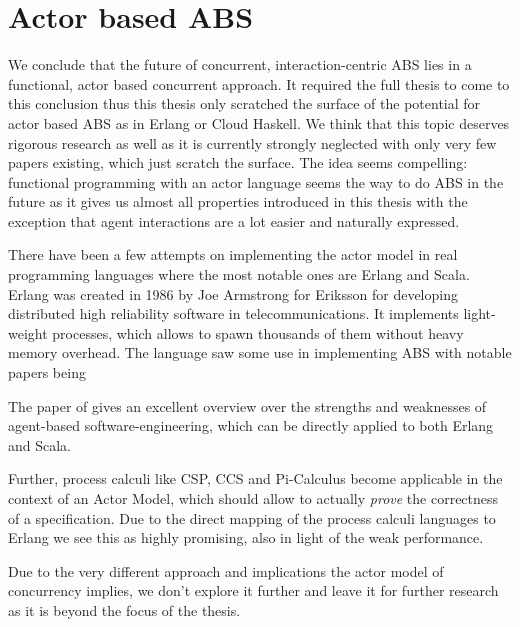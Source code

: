 \section{Actor based ABS}
We conclude that the future of concurrent, interaction-centric ABS lies in a functional, actor based concurrent approach. It required the full thesis to come to this conclusion thus this thesis only scratched the surface of the potential for actor based ABS as in Erlang or Cloud Haskell. We think that this topic deserves rigorous research as well as it is currently strongly neglected with only very few papers existing, which just scratch the surface. The idea seems compelling: functional programming with an actor language seems the way to do ABS in the future as it gives us almost all properties introduced in this thesis with the exception that agent interactions are a lot easier and naturally expressed.

There have been a few attempts on implementing the actor model in real programming languages where the most notable ones are Erlang and Scala. Erlang was created in 1986 by Joe Armstrong for Eriksson for developing distributed high reliability software in telecommunications. It implements light-weight processes, which allows to spawn thousands of them without heavy memory overhead. The language saw some use in implementing ABS with notable papers being \cite{bezirgiannis_improving_2013,di_stefano_using_2005, di_stefano_exat:_2007, varela_modelling_2004, sher_agent-based_2013}


The paper of \cite{jennings_agent-based_2000} gives an excellent overview over the strengths and weaknesses of agent-based software-engineering, which can be directly applied to both Erlang and Scala.

Further, process calculi like CSP, CCS and Pi-Calculus become applicable in the context of an Actor Model, which should allow to actually \textit{prove} the correctness of a specification. Due to the direct mapping of the process calculi languages to Erlang we see this as highly promising, also in light of the weak performance.

Due to the very different approach and implications the actor model of concurrency implies, we don't explore it further and leave it for further research as it is beyond the focus of the thesis.

